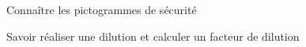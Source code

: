 \tetePremStssChim

\vspace*{-36pt}

\begin{objectifs}
  \item Connaître les pictogrammes de sécurité
  \item Savoir réaliser une dilution et calculer un facteur de dilution
\end{objectifs}



